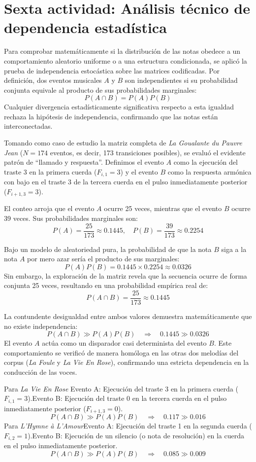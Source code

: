 \documentclass{article}
\theoremstyle{plain}
\theoremstyle{definition}
\begin{document}
\section*{Sexta actividad: Análisis técnico de dependencia estadística}

Para comprobar matemáticamente si la distribución de las notas obedece a un comportamiento aleatorio uniforme o a una estructura condicionada, se aplicó la prueba de independencia estocástica sobre las matrices codificadas. Por definición, dos eventos musicales $A$ y $B$ son independientes si su probabilidad conjunta equivale al producto de sus probabilidades marginales:
\[
	P(A \cap B) = P(A)P(B)
\]
Cualquier divergencia estadísticamente significativa respecto a esta igualdad rechaza la hipótesis de independencia, confirmando que las notas están interconectadas.

Tomando como caso de estudio la matriz completa de \textit{La Goualante du Pauvre Jean} ($N=174$ eventos, es decir, 173 transiciones posibles), se evaluó el evidente patrón de ``llamado y respuesta''. Definimos el evento $A$ como la ejecución del traste 3 en la primera cuerda ($F_{i,1} = 3$) y el evento $B$ como la respuesta armónica con bajo en el traste 3 de la tercera cuerda en el pulso inmediatamente posterior ($F_{i+1,3} = 3$).

El conteo arroja que el evento $A$ ocurre 25 veces, mientras que el evento $B$ ocurre 39 veces. Sus probabilidades marginales son:
\[
	P(A) = \frac{25}{173} \approx 0.1445, \quad P(B) = \frac{39}{173} \approx 0.2254
\]

Bajo un modelo de aleatoriedad pura, la probabilidad de que la nota $B$ siga a la nota $A$ por mero azar sería el producto de sus marginales:
\[
	P(A)P(B) = 0.1445 \times 0.2254 \approx 0.0326
\]
Sin embargo, la exploración de la matriz revela que la secuencia ocurre de forma conjunta 25 veces, resultando en una probabilidad empírica real de:
\[
	P(A \cap B) = \frac{25}{173} \approx 0.1445
\]

La contundente desigualdad entre ambos valores demuestra matemáticamente que no existe independencia:
\[
	P(A \cap B) \gg P(A)P(B) \quad \Longrightarrow \quad 0.1445 \gg 0.0326
\]
El evento $A$ actúa como un disparador casi determinista del evento $B$. Este comportamiento se verificó de manera homóloga en las otras dos melodías del corpus (\textit{La Foule} y \textit{La Vie En Rose}), confirmando una estricta dependencia en la conducción de las voces.

Para \textit{La Vie En Rose} Evento A: Ejecución del traste 3 en la primera cuerda ($F_{i,1} = 3$).Evento B: Ejecución del traste 0 en la tercera cuerda en el pulso inmediatamente posterior ($F_{i+1,3} = 0$).$$    P(A \cap B) \gg P(A)P(B) \quad \Longrightarrow \quad 0.117 \gg 0.016$$Para \textit{L'Hymne à L'Amour}Evento A: Ejecución del traste 1 en la segunda cuerda ($F_{i,2} = 1$).Evento B: Ejecución de un silencio (o nota de resolución) en la cuerda en el pulso inmediatamente posterior.$$    P(A \cap B) \gg P(A)P(B) \quad \Longrightarrow \quad 0.085 \gg 0.009$$
\end{document}
